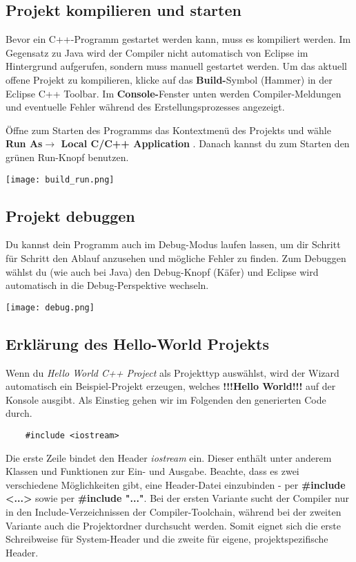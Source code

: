 \documentclass[
  accentcolor=tud1c,	%
  colorbacktitle,		%
  inverttitle,			%
  german,				%
  twoside
]{tudexercise}
\begin{document}
\subsection{Projekt kompilieren und starten}

Bevor ein C++-Programm gestartet werden kann, muss es kompiliert werden.
Im Gegensatz zu Java wird der Compiler nicht automatisch von Eclipse im Hintergrund aufgerufen, sondern muss manuell gestartet werden.
Um das aktuell offene Projekt zu kompilieren, klicke auf das \textbf{Build-}Symbol (\glqq Hammer\grqq) in der Eclipse C++ Toolbar.
Im \textbf{Console-}Fenster unten werden Compiler-Meldungen und eventuelle Fehler während des Erstellungsprozesses angezeigt.

Öffne zum Starten des Programms das Kontextmenü des Projekts und wähle \textbf{Run As$\rightarrow$ Local C/C++ Application }.
Danach kannst du zum Starten den grünen Run-Knopf benutzen.

\begin{center}
\texttt{[image: build\_run.png]}
\end{center}

\subsection{Projekt debuggen}
Du kannst dein Programm auch im Debug-Modus laufen lassen, um dir Schritt für Schritt den Ablauf anzusehen und mögliche Fehler zu finden.
Zum Debuggen wählst du (wie auch bei Java) den Debug-Knopf (\glqq Käfer\grqq) und Eclipse wird automatisch in die Debug-Perspektive wechseln.

\texttt{[image: debug.png]}

\subsection{Erklärung des Hello-World Projekts}
Wenn du \emph{Hello World C++ Project} als Projekttyp auswählst, wird der Wizard automatisch ein Beispiel-Projekt erzeugen, welches \textbf{!!!Hello World!!!} auf der Konsole ausgibt.
Als Einstieg gehen wir im Folgenden den generierten Code durch.

\begin{lstlisting}
	#include <iostream>
\end{lstlisting}

Die erste Zeile bindet den Header \emph{iostream} ein.
Dieser enthält unter anderem Klassen und Funktionen zur Ein- und Ausgabe.
Beachte, dass es zwei verschiedene Möglichkeiten gibt, eine Header-Datei einzubinden -  per \textbf{\#include <...>} sowie per \textbf{\#include "..."}. Bei der ersten Variante sucht der Compiler nur in den Include-Verzeichnissen der Compiler-Toolchain, während bei der zweiten Variante auch die Projektordner durchsucht werden. Somit eignet sich die erste Schreibweise für System-Header und die zweite für eigene, projektspezifische Header.
\end{document}
